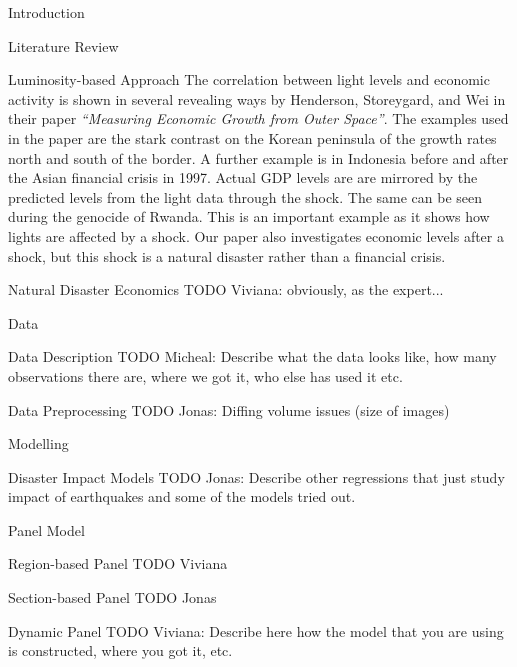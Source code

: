 \documentclass[12pt,fleqn,leqno,letterpaper]{article}
\begin{document}
\begin{section}{Introduction}
\begin{subsection}{Literature Review}
\begin{subsubsection}{Luminosity-based Approach}
      The correlation between light levels and economic activity is shown in several revealing ways by Henderson, Storeygard, and Wei in their paper \textit{``Measuring Economic Growth from Outer Space''}. The examples used in the paper are the stark contrast on the Korean peninsula of the growth rates north and south of the border. A further example is in Indonesia before and after the Asian financial crisis in 1997. Actual GDP levels are are mirrored by the predicted levels from the light data through the shock. The same can be seen during the genocide of Rwanda. This is an important example as it shows how lights are affected by a shock. Our paper also investigates economic levels after a shock, but this shock is a natural disaster rather than a financial crisis. 
 		
      
    \end{subsubsection}
    \begin{subsubsection}{Natural Disaster Economics}
      TODO Viviana: obviously, as the expert...
    \end{subsubsection}
  \end{subsection}
\end{section}

\begin{section}{Data}
  \begin{subsection}{Data Description}
    TODO Micheal: Describe what the data looks like, how many observations there are, where we got it, who else has used it etc.
  \end{subsection}
  \begin{subsection}{Data Preprocessing}
    TODO Jonas: Diffing volume issues (size of images)
  \end{subsection}
\end{section}

\begin{section}{Modelling}
  \begin{subsection}{Disaster Impact Models}
    TODO Jonas: Describe other regressions that just study impact of earthquakes and some of the models tried out.
  \end{subsection}
  \begin{subsection}{Panel Model}
    \begin{subsubsection}{Region-based Panel}
      TODO Viviana
    \end{subsubsection}
    \begin{subsubsection}{Section-based Panel}
      TODO Jonas
    \end{subsubsection}
    \begin{subsubsection}{Dynamic Panel}
      TODO Viviana: Describe here how the model that you are using is constructed, where you got it, etc.
    \end{subsubsection}
  \end{subsection}
\end{section}
\end{document}
